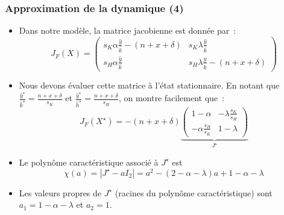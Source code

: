 \documentclass[10pt,notheorems]{beamer}
\theoremstyle{plain}
\theoremstyle{definition} %
\begin{document}
\begin{frame}
  \frametitle{Approximation de la dynamique (4)}

  \begin{itemize}

  \item Dans notre modèle, la matrice jacobienne est donnée par~:
    \[
      J_F(X) =
      \begin{pmatrix}
        s_K\alpha\frac{\hat y}{\hat k}-(n+x+\delta) & s_K\lambda\frac{\hat y}{\hat k} \\
        s_H\alpha\frac{\hat y}{\hat k} & s_H\lambda\frac{\hat y}{\hat k}-(n+x+\delta)
      \end{pmatrix}
    \]

    \medskip

  \item Nous devons évaluer cette matrice à l'état stationnaire. En notant que $\frac{\hat y^{\star}}{\hat k^{\star}} = \frac{n+x+\delta}{s_K}$ et $\frac{\hat y^{\star}}{\hat h^{\star}} = \frac{n+x+\delta}{s_H}$, on montre facilement que~:
    \[
      J_F(X^\star) =
      -(n+x+\delta)
      \underbrace{
      \begin{pmatrix}
        1-\alpha & -\lambda\frac{s_K}{s_H} \\
        -\alpha\frac{s_H}{s_K} & 1-\lambda
      \end{pmatrix}}_{J^\star}
    \]

  \item Le polynôme caractéristique associé à $J^\star$ est
    \[
      \chi(a) = |J^\star-aI_2| = a^2-(2-\alpha-\lambda)a+1-\alpha-\lambda
    \]

  \item Les valeurs propres de $J^\star$ (racines du polynôme caractéristique) sont $a_1 = 1-\alpha-\lambda$ et $a_2=1$.

  \end{itemize}
\end{frame}
\end{document}
